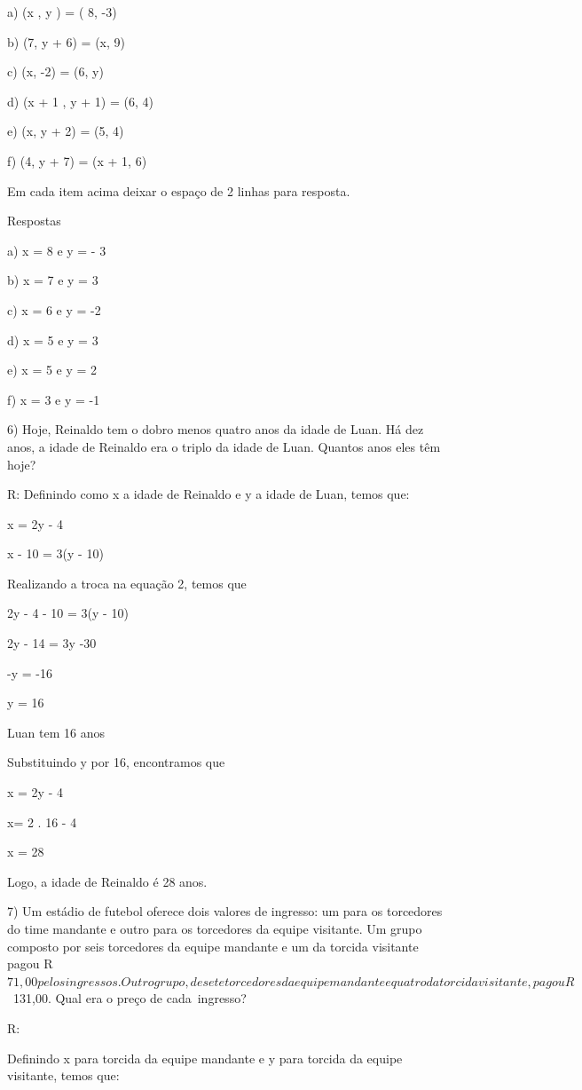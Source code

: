 a) (x , y ) = ( 8, -3)

b) (7, y + 6) = (x, 9)

c) (x, -2) = (6, y)

d) (x + 1 , y + 1) = (6, 4)

e) (x, y + 2) = (5, 4)

f) (4, y + 7) = (x + 1, 6)

Em cada item acima deixar o espaço de 2 linhas para resposta.

Respostas

a) x = 8 e y = - 3

b) x = 7 e y = 3

c) x = 6 e y = -2

d) x = 5 e y = 3

e) x = 5 e y = 2

f) x = 3 e y = -1

6) Hoje, Reinaldo tem o dobro menos quatro anos da idade de Luan. Há dez
anos, a idade de Reinaldo era o triplo da idade de Luan. Quantos anos
eles têm hoje?

R: Definindo como x a idade de Reinaldo e y a idade de Luan, temos que:

x = 2y - 4

x - 10 = 3(y - 10)

Realizando a troca na equação 2, temos que

2y - 4 - 10 = 3(y - 10)

2y - 14 = 3y -30

-y = -16

y = 16

Luan tem 16 anos

Substituindo y por 16, encontramos que

x = 2y - 4

x= 2 . 16 - 4

x = 28

Logo, a idade de Reinaldo é 28 anos.

7) Um estádio de futebol oferece dois valores de ingresso: um para os
torcedores do time mandante e outro para os torcedores da equipe
visitante. Um grupo composto por seis torcedores da equipe mandante e um
da torcida visitante pagou
R\(71,00 pelos ingressos. Outro grupo, de sete torcedores da equipe mandante e quatro da torcida visitante, pagou R\)~131,00.
Qual era o preço de cada~ingresso?

R:

Definindo x para torcida da equipe mandante e y para torcida da equipe
visitante, temos que:

